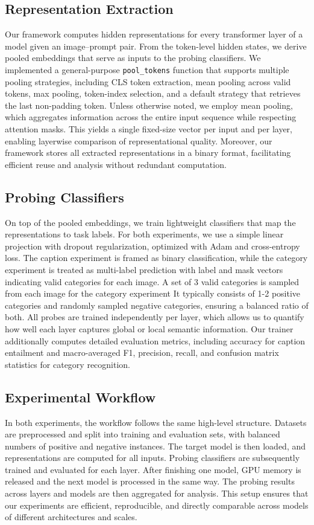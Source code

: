 \documentclass[11pt]{article}
\begin{document}
\subsection{Representation Extraction}
Our framework computes hidden representations for every transformer layer of a model
given an image--prompt pair. From the token-level hidden states, we derive pooled embeddings
that serve as inputs to the probing classifiers. We implemented a general-purpose
\texttt{pool\_tokens} function that supports multiple pooling strategies, including
CLS token extraction, mean pooling across valid tokens, max pooling, token-index selection,
and a default strategy that retrieves the last non-padding token. Unless otherwise noted,
we employ mean pooling, which aggregates information across the entire input sequence
while respecting attention masks. This yields a single fixed-size vector per input
and per layer, enabling layerwise comparison of representational quality.
Moreover, our framework stores all extracted representations in a binary format,
facilitating efficient reuse and analysis without redundant computation.


\subsection{Probing Classifiers}
On top of the pooled embeddings, we train lightweight classifiers that map the
representations to task labels. For both experiments, we use a simple linear
projection with dropout regularization, optimized with Adam and cross-entropy loss.
The caption experiment is framed as binary classification, while the category experiment
is treated as multi-label prediction with label and mask vectors indicating valid
categories for each image. A set of 3 valid categories is sampled from each image for the category experiment
It typically consists of 1-2 positive categories and randomly sampled negative categories,
ensuring a balanced ratio of both. All probes are trained independently per layer, which allows
us to quantify how well each layer captures global or local semantic information.
Our trainer additionally computes detailed evaluation metrics, including accuracy for
caption entailment and macro-averaged F1, precision, recall, and confusion matrix
statistics for category recognition.

\subsection{Experimental Workflow}
In both experiments, the workflow follows the same high-level structure.
Datasets are preprocessed and split into training and evaluation sets, with
balanced numbers of positive and negative instances. The target model is then
loaded, and representations are computed for all inputs. Probing classifiers are subsequently trained
and evaluated for each layer. After finishing one model, GPU memory is released
and the next model is processed in the same way. The probing results across
layers and models are then aggregated for analysis. This setup ensures that
our experiments are efficient, reproducible, and directly comparable across
models of different architectures and scales.
\end{document}

